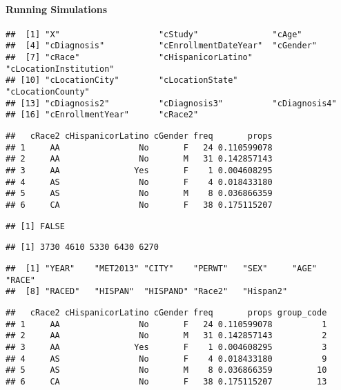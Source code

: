 \documentclass[
]{article}
\begin{document}
\hypertarget{running-simulations}{%
\paragraph{Running Simulations}\label{running-simulations}}

\begin{verbatim}
##  [1] "X"                    "cStudy"               "cAge"                
##  [4] "cDiagnosis"           "cEnrollmentDateYear"  "cGender"             
##  [7] "cRace"                "cHispanicorLatino"    "cLocationInstitution"
## [10] "cLocationCity"        "cLocationState"       "cLocationCounty"     
## [13] "cDiagnosis2"          "cDiagnosis3"          "cDiagnosis4"         
## [16] "cEnrollmentYear"      "cRace2"
\end{verbatim}

\begin{verbatim}
##   cRace2 cHispanicorLatino cGender freq       props
## 1     AA                No       F   24 0.110599078
## 2     AA                No       M   31 0.142857143
## 3     AA               Yes       F    1 0.004608295
## 4     AS                No       F    4 0.018433180
## 5     AS                No       M    8 0.036866359
## 6     CA                No       F   38 0.175115207
\end{verbatim}

\begin{verbatim}
## [1] FALSE
\end{verbatim}

\begin{verbatim}
## [1] 3730 4610 5330 6430 6270
\end{verbatim}

\begin{verbatim}
##  [1] "YEAR"    "MET2013" "CITY"    "PERWT"   "SEX"     "AGE"     "RACE"   
##  [8] "RACED"   "HISPAN"  "HISPAND" "Race2"   "Hispan2"
\end{verbatim}

\begin{verbatim}
##   cRace2 cHispanicorLatino cGender freq       props group_code
## 1     AA                No       F   24 0.110599078          1
## 2     AA                No       M   31 0.142857143          2
## 3     AA               Yes       F    1 0.004608295          3
## 4     AS                No       F    4 0.018433180          9
## 5     AS                No       M    8 0.036866359         10
## 6     CA                No       F   38 0.175115207         13
\end{verbatim}
\end{document}
